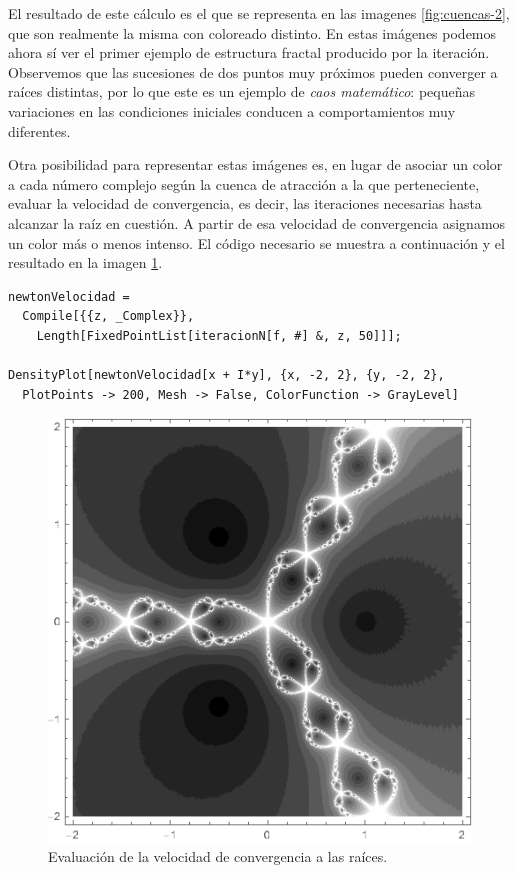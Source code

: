 El resultado de este cálculo es el que se representa en las imagenes \ref{fig:cuencas-2}, que son realmente la misma con coloreado distinto. En estas imágenes podemos ahora sí ver el primer ejemplo de estructura fractal producido por la iteración. Observemos que las sucesiones de dos puntos muy próximos pueden converger a raíces distintas, por lo que este es un ejemplo de \textit{caos matemático}: pequeñas variaciones en las condiciones iniciales conducen a comportamientos muy diferentes.

Otra posibilidad para representar estas imágenes es, en lugar de asociar un color a cada número complejo según la cuenca de atracción a la que perteneciente, evaluar la velocidad de convergencia, es decir, las iteraciones necesarias hasta alcanzar la raíz en cuestión. A partir de esa velocidad de convergencia asignamos un color más o menos intenso. El código necesario se muestra a continuación y el resultado en la imagen \ref{fig:cuencas-velocidad}.

\begin{verbatim}
newtonVelocidad = 
  Compile[{{z, _Complex}}, 
    Length[FixedPointList[iteracionN[f, #] &, z, 50]]];

DensityPlot[newtonVelocidad[x + I*y], {x, -2, 2}, {y, -2, 2}, 
  PlotPoints -> 200, Mesh -> False, ColorFunction -> GrayLevel]
\end{verbatim}

\begin{figure} [h]
\centering
\includegraphics[scale = 0.5]{img/cuencas-velocidad.png}
\caption{Evaluación de la velocidad de convergencia a las raíces.}
    \label{fig:cuencas-velocidad}
\end{figure}

